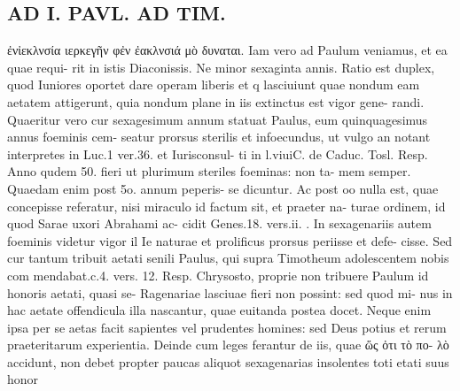 \documentclass{article}
\begin{document}
\begin{pages}
\section*{AD I. PAVL. AD TIM. }
\marginpar{[ p.*24 ]}ἐνἰεκλνσία ιερκεγῆν φἐν ἐακλνσιά μὸ δυναται. Iam vero ad Paulum veniamus, et ea quae requi- rit in istis Diaconissis. Ne minor sexaginta annis. Ratio est duplex, quod Iuniores oportet dare operam liberis et q lasciuiunt quae nondum eam aetatem attigerunt, quia nondum plane in iis extinctus est vigor gene- randi. Quaeritur vero cur sexagesimum annum statuat Paulus, eum quinquagesimus annus foeminis cem- seatur prorsus sterilis et infoecundus, ut vulgo an notant interpretes in Luc.1 ver.36. et Iurisconsul- ti in l.viuiC. de Caduc. Tosl. Resp. Anno qudem 50. fieri ut plurimum steriles foeminas: non ta- mem semper. Quaedam enim post 5o. annum peperis- se dicuntur. Ac post oo nulla est, quae concepisse referatur, nisi miraculo id factum sit, et praeter na- turae ordinem, id quod Sarae uxori Abrahami ac- cidit Genes.18. vers.ii. . In sexagenariis autem foeminis videtur vigor il Ie naturae et prolificus prorsus periisse et defe- cisse. Sed cur tantum tribuit aetati senili Paulus, qui supra Timotheum adolescentem nobis com mendabat.c.4. vers. 12. Resp. Chrysosto, proprie non tribuere Paulum id honoris aetati, quasi se- Ragenariae lasciuae fieri non possint: sed quod mi- nus in hac aetate offendicula illa nascantur, quae euitanda postea docet. Neque enim ipsa per se aetas facit sapientes vel prudentes homines: sed Deus potius et rerum praeteritarum experientia. Deinde cum leges ferantur de iis, quae ὥς ὀτι τὸ πο- λὸ accidunt, non debet propter paucas aliquot sexagenarias insolentes toti etati suus honor 

\end{pages}
\end{document}
